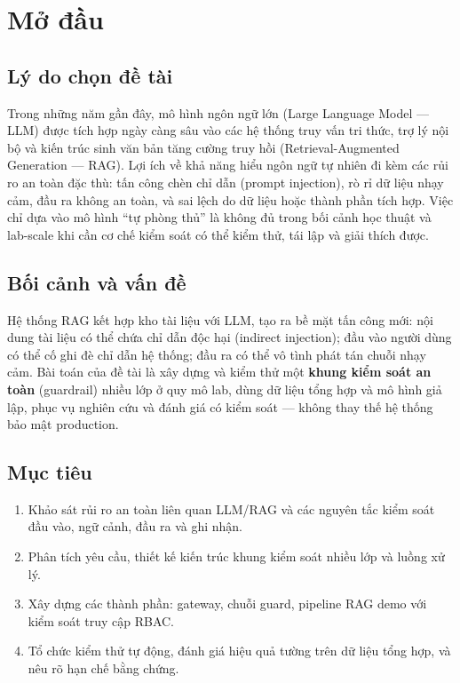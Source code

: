 \chapter*{Mở đầu}

\section*{Lý do chọn đề tài}

Trong những năm gần đây, mô hình ngôn ngữ lớn (Large Language Model --- LLM) được tích hợp ngày càng sâu vào các hệ thống truy vấn tri thức, trợ lý nội bộ và kiến trúc sinh văn bản tăng cường truy hồi (Retrieval-Augmented Generation --- RAG). Lợi ích về khả năng hiểu ngôn ngữ tự nhiên đi kèm các rủi ro an toàn đặc thù: tấn công chèn chỉ dẫn (prompt injection), rò rỉ dữ liệu nhạy cảm, đầu ra không an toàn, và sai lệch do dữ liệu hoặc thành phần tích hợp. Việc chỉ dựa vào mô hình ``tự phòng thủ'' là không đủ trong bối cảnh học thuật và lab-scale khi cần cơ chế kiểm soát có thể kiểm thử, tái lập và giải thích được.

\section*{Bối cảnh và vấn đề}

Hệ thống RAG kết hợp kho tài liệu với LLM, tạo ra bề mặt tấn công mới: nội dung tài liệu có thể chứa chỉ dẫn độc hại (indirect injection); đầu vào người dùng có thể cố ghi đè chỉ dẫn hệ thống; đầu ra có thể vô tình phát tán chuỗi nhạy cảm. Bài toán của đề tài là xây dựng và kiểm thử một \textbf{khung kiểm soát an toàn} (guardrail) nhiều lớp ở quy mô lab, dùng dữ liệu tổng hợp và mô hình giả lập, phục vụ nghiên cứu và đánh giá có kiểm soát --- không thay thế hệ thống bảo mật production.

\section*{Mục tiêu}

\begin{enumerate}
    \item Khảo sát rủi ro an toàn liên quan LLM/RAG và các nguyên tắc kiểm soát đầu vào, ngữ cảnh, đầu ra và ghi nhận.
    \item Phân tích yêu cầu, thiết kế kiến trúc khung kiểm soát nhiều lớp và luồng xử lý.
    \item Xây dựng các thành phần: gateway, chuỗi guard, pipeline RAG demo với kiểm soát truy cập RBAC.
    \item Tổ chức kiểm thử tự động, đánh giá hiệu quả tường trên dữ liệu tổng hợp, và nêu rõ hạn chế bằng chứng.
\end{enumerate}


